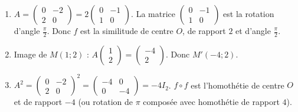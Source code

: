 \documentclass[11pt]{article}
\begin{document}
\begin{corrige}[Exercice 3]
\begin{enumerate}
\item $A=\begin{pmatrix} 0 & -2 \\ 2 & 0 \end{pmatrix}=2\begin{pmatrix} 0 & -1 \\ 1 & 0 \end{pmatrix}$.
La matrice $\begin{pmatrix} 0 & -1 \\ 1 & 0 \end{pmatrix}$ est la rotation d'angle $\frac{\pi}{2}$.
Donc $f$ est la similitude de centre $O$, de rapport $2$ et d'angle $\frac{\pi}{2}$.
\item Image de $M(1;2)$ : $A\begin{pmatrix} 1 \\ 2 \end{pmatrix}=\begin{pmatrix} -4 \\ 2 \end{pmatrix}$. Donc $M'(-4;2)$.
\item $A^2 = \begin{pmatrix} 0 & -2 \\ 2 & 0 \end{pmatrix}^2 = \begin{pmatrix} -4 & 0 \\ 0 & -4 \end{pmatrix} = -4I_2$.
$f\circ f$ est l'homothétie de centre $O$ et de rapport $-4$ (ou rotation de $\pi$ composée avec homothétie de rapport $4$).
\end{enumerate}
\end{corrige}
\end{document}
